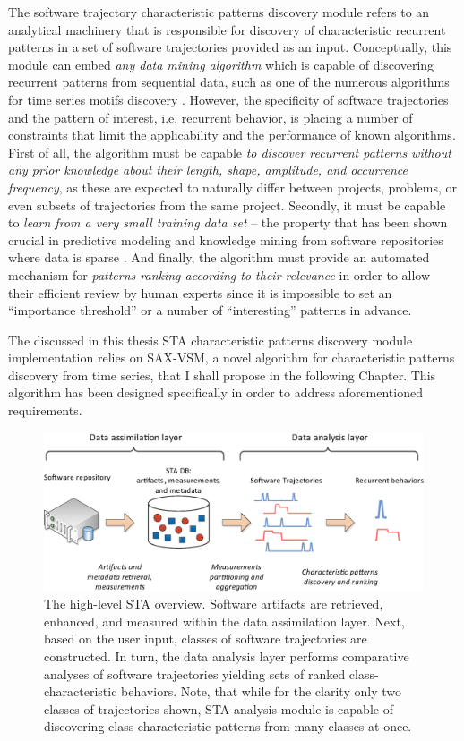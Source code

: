 The software trajectory characteristic patterns discovery module refers to an analytical machinery that 
is responsible for discovery of characteristic recurrent patterns in a set of software trajectories provided as 
an input. Conceptually, this module can embed \textit{any data mining algorithm} which is capable of 
discovering recurrent patterns from sequential data, such as one of the numerous algorithms for time series 
motifs discovery \cite{citeulike:13197378}.
However, the specificity of software trajectories and the pattern of interest, i.e. recurrent behavior, 
is placing a number of constraints that limit the applicability and the performance of known algorithms.
First of all, the algorithm must be capable \textit{to discover recurrent patterns without any prior knowledge 
about their length, shape, amplitude, and occurrence frequency}, as these are expected to naturally differ 
between projects, problems, or even subsets of trajectories from the same project.
Secondly, it must be capable to \textit{learn from a very small training data set} --
the property that has been shown crucial in predictive modeling and knowledge mining from software 
repositories where data is sparse \cite{citeulike:6055293}.
And finally, the algorithm must provide an automated mechanism for 
\textit{patterns ranking according to their relevance} in order to allow their efficient review by human experts 
since it is impossible to set an ``importance threshold'' or a number of ``interesting'' patterns in advance.

The discussed in this thesis STA characteristic patterns discovery module implementation relies on SAX-VSM,
a novel algorithm for characteristic patterns discovery from time series, that I shall propose in the following Chapter. 
This algorithm has been designed specifically in order to address aforementioned requirements.

\begin{figure}[t]
   \centering
   \includegraphics[width=150mm]{figures/Flow-analysis.eps}
   \caption{The high-level STA overview. Software artifacts are retrieved, enhanced, and measured within the
   data assimilation layer. Next, based on the user input, classes of software trajectories are constructed.   
   In turn, the data analysis layer performs comparative analyses of software trajectories yielding sets
   of ranked class-characteristic behaviors.
   Note, that while for the clarity only two classes of trajectories shown, STA analysis module is capable of
   discovering class-characteristic patterns from many classes at once.}
   \label{fig:sta-full-overview}
\end{figure}

